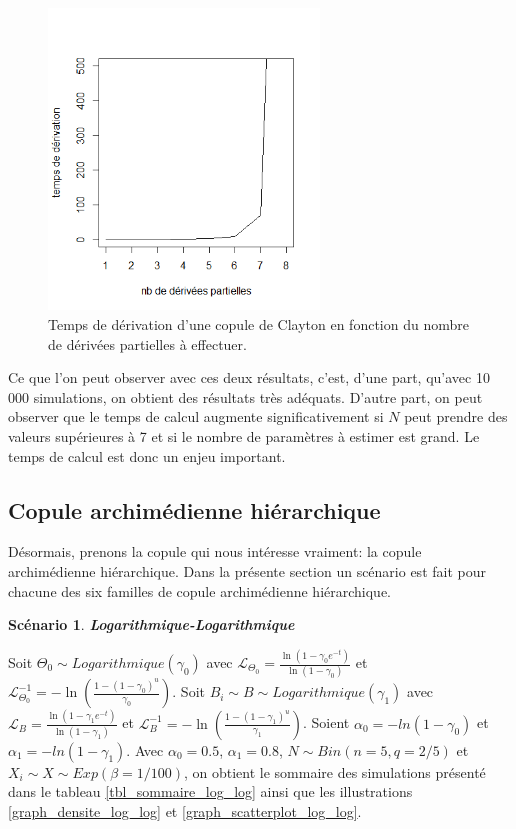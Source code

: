\documentclass{article}
\newtheorem{Scenario}{Scénario}
\begin{document}
		\begin{figure}[H]
			\centering
			\includegraphics[height=8cm]{Graph/graph_temps_deriv.png}
			\caption{Temps de dérivation d'une copule de Clayton en fonction du nombre de dérivées partielles à effectuer.}
			\label{graph_temps_deriv}
		\end{figure}
		
			
		Ce que l'on peut observer avec ces deux résultats, c'est, d'une part, qu'avec 10\,000 simulations, on obtient des résultats très adéquats. D'autre part, on peut observer que le temps de calcul augmente significativement si $N$ peut prendre des valeurs supérieures à 7 et si le nombre de paramètres à estimer est grand. Le temps de calcul est donc un enjeu important.

	\subsection{Copule archimédienne hiérarchique}
		Désormais, prenons la copule qui nous intéresse vraiment: la copule archimédienne hiérarchique. Dans la présente section un scénario est fait pour chacune des six familles de copule archimédienne hiérarchique.\\
		
		\begin{Scenario}\label{scenario_log_log}
			\textbf{Logarithmique-Logarithmique}
		\end{Scenario}
	
		Soit $\Theta_0 \sim Logarithmique(\gamma_0)$ avec $\mathscr{L}_{\Theta_0} = \frac{\ln(1-\gamma_0 e^{-t})}{\ln(1-\gamma_0)}$ et $\mathscr{L}^{-1}_{\Theta_0} = -\ln \left( \frac{1-(1-\gamma_0)^u}{\gamma_0} \right)$.
		Soit $B_i \sim B \sim Logarithmique(\gamma_1)$ avec $\mathscr{L}_{B} = \frac{\ln(1-\gamma_1 e^{-t})}{\ln(1-\gamma_1)}$ et $\mathscr{L}^{-1}_{B} = -\ln \left( \frac{1-(1-\gamma_1)^u}{\gamma_1} \right)$. Soient $\alpha_{0} = -ln(1-\gamma_0)$ et $\alpha_{1} = -ln(1-\gamma_1)$. Avec $\alpha_0 = 0.5$, $\alpha_1 = 0.8$, $N\sim Bin(n=5, q=2/5)$ et $X_i \sim X \sim Exp(\beta = 1/100)$, on obtient le sommaire des simulations présenté dans le tableau \ref{tbl_sommaire_log_log} ainsi que les illustrations \ref{graph_densite_log_log} et \ref{graph_scatterplot_log_log}.
		
\end{document}
